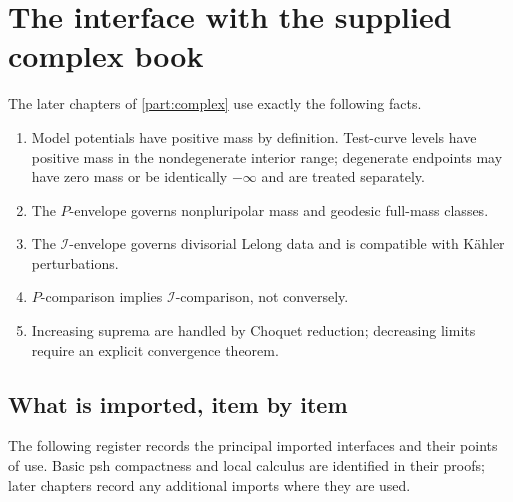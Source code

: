 \section{The interface with the supplied complex book}
\label{sec:ch51-interface}

\begin{remark}
\label{chk:complex-interface}
The later chapters of \cref{part:complex} use exactly the following facts.
\begin{enumerate}
\item Model potentials have positive mass by definition. Test-curve
      levels have positive mass in the nondegenerate interior range;
      degenerate endpoints may have zero mass or be identically
      $-\infty$ and are treated separately.
\item The $P$-envelope governs nonpluripolar mass and geodesic full-mass
      classes.
\item The $\mathcal I$-envelope governs divisorial Lelong data and is
      compatible with K\"ahler perturbations.
\item $P$-comparison implies $\mathcal I$-comparison, not conversely.
\item Increasing suprema are handled by Choquet reduction; decreasing
      limits require an explicit convergence theorem.
\end{enumerate}
\end{remark}

\subsection{What is imported, item by item}
\label{sec:ch51-import-ledger}

The following register records the principal imported interfaces and
their points of use.  Basic psh compactness and local calculus are
identified in their proofs; later chapters record any additional imports
where they are used.

